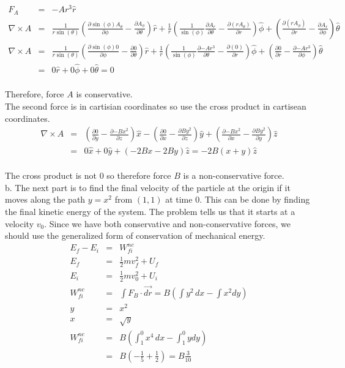 \documentclass[11pt]{amsart}
\begin{document}
\begin{eqnarray*}
F_{A} &=& -Ar^{3}\hat{r} \\
\nabla \times A &=& 
\frac{1}{r\sin(\theta)}\left(\frac{\partial{\sin(\phi)A_{\theta}}}{\partial{\phi}}-\frac{\partial{A_{\phi}}}{\partial{\theta}}\right)\hat{r}
+\frac{1}{r}\left(\frac{1}{\sin(\phi)}\frac{\partial{A_{r}}}{\partial{\theta}}-\frac{\partial{(rA_{\theta})}}{\partial{r}}\right)\hat{\phi}
+\left(\frac{\partial{(rA_{\phi})}}{\partial{r}}-\frac{\partial{A_{r}}}{\partial{\phi}}\right)\hat{\theta} \\
\nabla \times A &=& 
\frac{1}{r\sin(\theta)}\left(\frac{\partial{\sin(\phi)0}}{\partial{\phi}}-\frac{\partial{0}}{\partial{\theta}}\right)\hat{r}
+\frac{1}{r}\left(\frac{1}{\sin(\phi)}\frac{\partial{-Ar^{3}}}{\partial{\theta}}-\frac{\partial{(0)}}{\partial{r}}\right)\hat{\phi}
+\left(\frac{\partial{0}}{\partial{r}}-\frac{\partial{-Ar^{3}}}{\partial{\phi}}\right)\hat{\theta} \\
&=& 0\hat{r} +0\hat{\phi}+0\hat{\theta} = 0
\end{eqnarray*} \\
Therefore, force $A$ is conservative. \\
The second force is in cartisian coordinates so use the cross product in cartisean coordinates. \\
\begin{eqnarray*} 
\nabla \times A &=& \left(\frac{\partial{0}}{\partial{y}}-\frac{\partial{-Bx^{2}}}{\partial{z}}\right)\hat{x}
-\left(\frac{\partial{0}}{\partial{x}}-\frac{\partial{By^{2}}}{\partial{z}}\right)\hat{y}
+\left(\frac{\partial{-Bx^{2}}}{\partial{x}}-\frac{\partial{By^{2}}}{\partial{y}}\right)\hat{z} \\
&=& 0\hat{x}+0\hat{y}+(-2Bx-2By)\hat{z} = -2B(x+y)\hat{z} 
\end{eqnarray*} \\
The cross product is not 0 so therefore force $B$ is a non-conservative force. \\
b. The next part is to find the final velocity of the particle at the origin if it moves along the path $y=x^{2}$ from $(1,1)$ at time 0. This can be done by finding the final kinetic energy of the system. The problem tells us that it starts at a velocity $v_{0}$. Since we have both conservative and non-conservative forces, we should use the generalized form of conservation of mechanical energy. \\ 
\begin{eqnarray*}
E_{f}-E_{i} &=& W_{fi}^{nc} \\
E_{f} &=& \frac{1}{2}mv_{f}^{2} + U_{f} \\
E_{i} &=& \frac{1}{2}mv_{0}^{2} + U_{i} \\
W_{fi}^{nc} &=& \int{F_{B}\cdot{\vec{dr}}} =B\left(\int{y^{2}}\,dx-\int{x^{2}}dy\right) \\
y &=& x^{2} \\
x &=& \sqrt{y} \\
W_{fi}^{nc} &=&B\left(\int_{1}^{0}x^{4}\,dx-\int_{1}^{0}ydy\right) \\
&=&B\left(-\frac{1}{5}+\frac{1}{2}\right) =  B\frac{3}{10} 
\end{eqnarray*} \\
\end{document}
